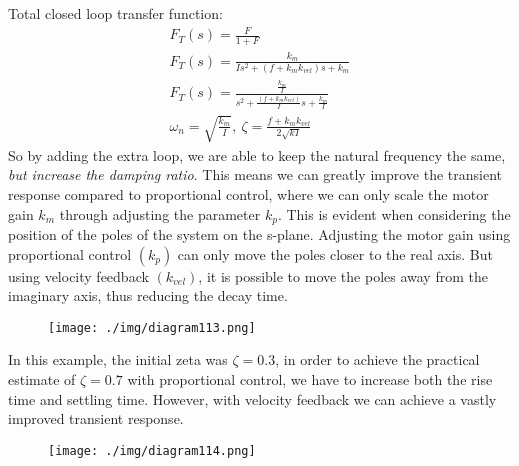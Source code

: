 Total closed loop transfer function:
\begin{gather}
  F_T(s) = \frac{F}{1 + F}\\
  F_T(s) = \frac{k_m}{Is^2 + (f+k_m k_{vel})s + k_m}\\
  F_T(s) = \frac{\frac{k_m}{I}}{s^2 + \frac{\left(f + k_m k_{vel}\right)}{I} s + \frac{k_m}{I}}\\
  \omega_n = \sqrt{\frac{k_m}{I}}, \ \zeta = \frac{f + k_m k_{vel}}{2 \sqrt{kI}}
\end{gather}
So by adding the extra loop, we are able to keep the natural frequency the same, \textit{but increase the damping ratio}. This means we can greatly improve the transient response compared to proportional control, where we can only scale the motor gain $k_m$ through adjusting the parameter $k_p$. This is evident when considering the position of the poles of the system on the s-plane. Adjusting the motor gain using proportional control $\left( k_p\right)$ can only move the poles closer to the real axis. But using velocity feedback $\left( k_{vel}\right)$, it is possible to move the poles away from the imaginary axis, thus reducing the decay time.
\begin{figure}[H]
  \centerline{\texttt{[image: ./img/diagram113.png]}}
  \caption{}
\end{figure}
In this example, the initial zeta was $\zeta = 0.3$, in order to achieve the practical estimate of $\zeta = 0.7$ with proportional control, we have to increase both the rise time and settling time. However, with velocity feedback we can achieve a vastly improved transient response.
\begin{figure}[H]
  \centerline{\texttt{[image: ./img/diagram114.png]}}
  \caption{}
\end{figure}
